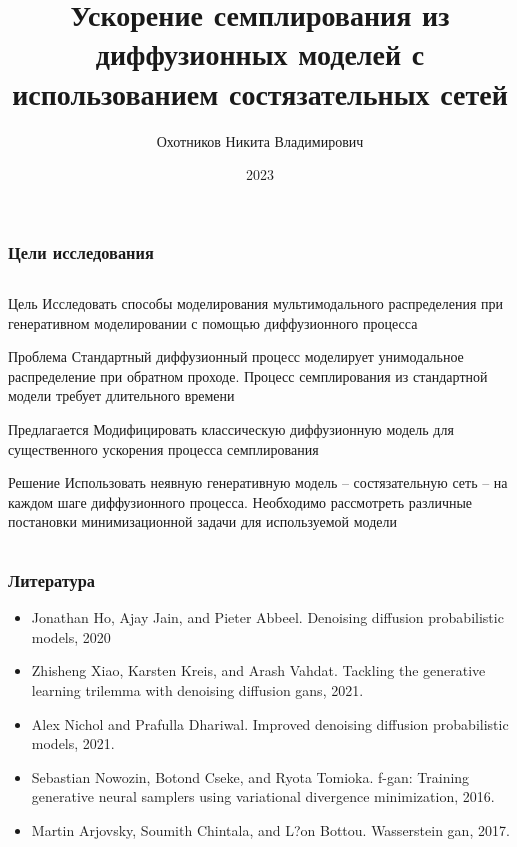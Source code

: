 \documentclass[8pt]{beamer}
\title[]{Ускорение семплирования из диффузионных моделей с использованием состязательных сетей}
\author{Охотников Никита Владимирович}
\institute{МФТИ}
\date{2023}
\newcommand\FontUP{\fontsize{10}{12}\selectfont}
\begin{document}
{
\begin{frame}
  \titlepage
\end{frame}
}

\begin{frame}
	\frametitle{Цели исследования}
	
	\begin{columns}
		\begin{column}{0.9\textwidth}
	
			\begin{block}{Цель}
				\smallskip
			Исследовать способы моделирования мультимодального распределения при генеративном моделировании с помощью диффузионного процесса
			\end{block}	
			\vfill
			\begin{block}{Проблема}
					\smallskip
				Стандартный диффузионный процесс моделирует унимодальное распределение при обратном проходе. Процесс семплирования из стандартной модели требует длительного времени
			\end{block}	
			\vfill
			\begin{block}{Предлагается}
				\smallskip
				Модифицировать классическую диффузионную модель для существенного ускорения процесса семплирования
			\end{block}	
			\vfill
			\begin{block}{Решение}
				\smallskip
				Использовать неявную генеративную модель -- состязательную сеть -- на каждом шаге диффузионного процесса. Необходимо
				рассмотреть различные постановки минимизационной задачи для используемой модели
			\end{block}	
	     \end{column}
	\end{columns}


\end{frame}

\begin{frame}
	\frametitle{Литература}
	\FontUP
	\begin{itemize}
		\item Jonathan Ho, Ajay Jain, and Pieter Abbeel. Denoising diffusion probabilistic models, 2020
		\medskip
		\item Zhisheng Xiao, Karsten Kreis, and Arash Vahdat. Tackling the generative learning trilemma with denoising diffusion gans, 2021.
		\medskip
		\item Alex Nichol and Prafulla Dhariwal. Improved denoising diffusion probabilistic models, 2021.
		\medskip
		\item Sebastian Nowozin, Botond Cseke, and Ryota Tomioka. f-gan: Training generative neural samplers using
		variational divergence minimization, 2016.
		\medskip
		\item Martin Arjovsky, Soumith Chintala, and L?on Bottou. Wasserstein gan, 2017.
	\end{itemize}
	
\end{frame}
\end{document}

